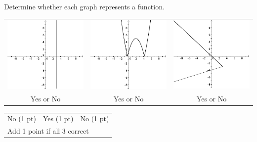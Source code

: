 {
	Determine whether each graph represents a function.
	\begin{center}
	\begin{tabular}{ccc}
	\includegraphics[scale=1]{fig100-22-c-i.pdf} & \includegraphics[scale=1]{fig100-22-c-ii.pdf} & \includegraphics[scale=1]{fig100-22-d-i.pdf}\\
	Yes or No & Yes or No & Yes or No
	\end{tabular}
	\end{center}
}
{
	\begin{tabular}{lll}
	No (1 pt) & Yes (1 pt) & No (1 pt)\\
	\multicolumn{3}{l}{Add 1 point if all 3 correct}
	\end{tabular}
}

